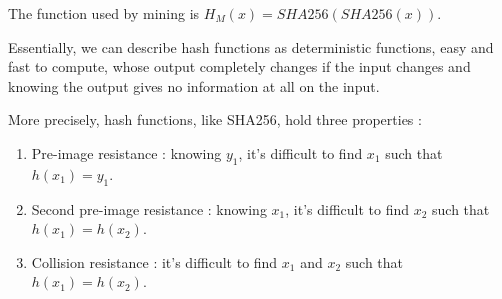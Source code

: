 The function used by mining is $H_M(x) = SHA256(SHA256(x))$.

Essentially, we can describe hash functions as deterministic functions, easy and fast to compute, whose output completely changes if the input changes and knowing the output gives no information at all on the input.

More precisely, hash functions, like SHA256, hold three properties : \newline

\begin{enumerate}
  \item Pre-image resistance : knowing $y_1$, it's difficult to find $x_1$ such that $h(x_1) = y_1$.
  \item Second pre-image resistance : knowing $x_1$, it's difficult to find $x_2$ such that $h(x_1) = h(x_2)$.
  \item Collision resistance : it's difficult to find $x_1$ and $x_2$ such that $h(x_1) = h(x_2)$.
\end{enumerate}
